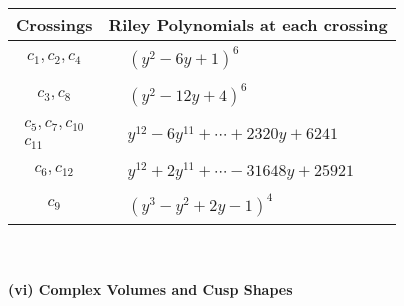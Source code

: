 \documentclass[1p]{elsarticle_modified}
\theoremstyle{definition}
\begin{document}
\begin{tabular}{m{50pt}|m{274pt}}
Crossings & \hspace{64pt}Riley Polynomials at each crossing \\
\hline $$\begin{aligned}c_{1},c_{2},c_{4}\end{aligned}$$&$\begin{aligned}
&(y^2-6 y+1)^6
\end{aligned}$\\
\hline $$\begin{aligned}c_{3},c_{8}\end{aligned}$$&$\begin{aligned}
&(y^2-12 y+4)^6
\end{aligned}$\\
\hline $$\begin{aligned}c_{5},c_{7},c_{10}\\c_{11}\end{aligned}$$&$\begin{aligned}
&y^{12}-6 y^{11}+\cdots+2320 y+6241
\end{aligned}$\\
\hline $$\begin{aligned}c_{6},c_{12}\end{aligned}$$&$\begin{aligned}
&y^{12}+2 y^{11}+\cdots-31648 y+25921
\end{aligned}$\\
\hline $$\begin{aligned}c_{9}\end{aligned}$$&$\begin{aligned}
&(y^3- y^2+2 y-1)^4
\end{aligned}$\\
\hline
\end{tabular}\\~\\
\newpage\flushleft \textbf{(vi) Complex Volumes and Cusp Shapes}
\end{document}
